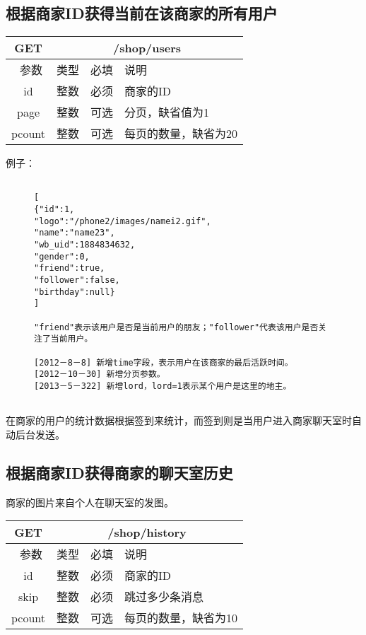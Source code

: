 \documentclass[cs4size]{ctexartutf8}
\begin{document}
\subsection{根据商家ID获得当前在该商家的所有用户}

\begin{table}[H]
   \begin{center}
\begin{tabular}{|c|c|c|p{12cm}|}
\hline
GET & \multicolumn{3}{|c|}{/shop/users} \\
\hline\hline
 \  参数  & 类型 & 必填 &  说明  \\
\hline
 id  & 整数 & 必须 & 商家的ID\\
  \hline
 page  & 整数 & 可选 & 分页，缺省值为1\\ 
 \hline
 pcount  & 整数 & 可选 & 每页的数量，缺省为20\\ 
\hline
\end{tabular}
   \end{center}
\end{table}


例子：

\begin{figure}[H]
\begin{verbatim}

[
{"id":1,
"logo":"/phone2/images/namei2.gif",
"name":"name23",
"wb_uid":1884834632,
"gender":0,
"friend":true,
"follower":false,
"birthday":null}
]

"friend"表示该用户是否是当前用户的朋友；"follower"代表该用户是否关注了当前用户。

[2012－8－8] 新增time字段，表示用户在该商家的最后活跃时间。
[2012－10－30] 新增分页参数。
[2013－5－322] 新增lord，lord=1表示某个用户是这里的地主。


\end{verbatim}
\end{figure}

在商家的用户的统计数据根据签到来统计，而签到则是当用户进入商家聊天室时自动后台发送。


\subsection{根据商家ID获得商家的聊天室历史}
商家的图片来自个人在聊天室的发图。\label{photowall}

\begin{table}[H]
   \begin{center}
\begin{tabular}{|c|c|c|p{12cm}|}
\hline
GET & \multicolumn{3}{|c|}{/shop/history} \\
\hline\hline
 \  参数  & 类型 & 必填 &  说明  \\
\hline
 id  & 整数 & 必须 & 商家的ID\\
   \hline
 skip  & 整数 & 必须 & 跳过多少条消息\\ 
 \hline
 pcount  & 整数 & 可选 & 每页的数量，缺省为10\\ 
\hline
\end{tabular}
   \end{center}
\end{table}
\end{document}
